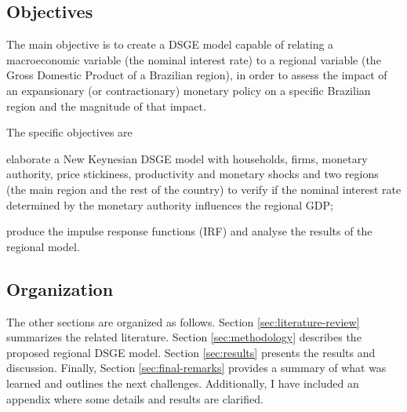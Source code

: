 \documentclass[../thesis.tex]{subfiles}
\begin{document}
\subsection*{Objectives}

The main objective is to create a DSGE model capable of relating a macroeconomic variable (the nominal interest rate) to a regional variable (the Gross Domestic Product of a Brazilian region), in order to assess the impact of an expansionary (or contractionary) monetary policy on a specific Brazilian region and the magnitude of that impact.

The specific objectives are
\begin{enumerate*}[label=(\arabic*)]
	\item elaborate a New Keynesian DSGE model with households, firms, monetary authority, price stickiness, productivity and monetary shocks and two regions (the main region and the rest of the country) to verify if the nominal interest rate determined by the monetary authority influences the regional GDP;
	\item produce the impulse response functions (IRF) and analyse the results of the regional model.
\end{enumerate*}

\subsection*{Organization}

The other sections are organized as follows. Section \ref{sec:literature-review} summarizes the related literature. Section \ref{sec:methodology} describes the proposed regional DSGE model. Section \ref{sec:results} presents the results and discussion. Finally, Section \ref{sec:final-remarks} provides a summary of what was learned and outlines the next challenges. Additionally, I have included an appendix where some details and results are clarified.
\end{document}
